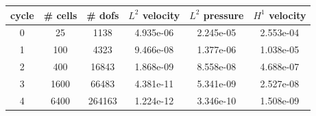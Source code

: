 \documentclass[10pt]{report}
\begin{document}
\begin{table}[H]
\begin{center}
\begin{tabular}{|c|c|c|c|c|c|} \hline
cycle & \# cells & \# dofs & $L^2$ velocity & $L^2$ pressure & $H^1$ velocity\\ \hline
0 & 25 & 1138 & 4.935e-06 & 2.245e-05 & 2.553e-04\\ \hline
1 & 100 & 4323 & 9.466e-08 & 1.377e-06 & 1.038e-05\\ \hline
2 & 400 & 16843 & 1.868e-09 & 8.558e-08 & 4.688e-07\\ \hline
3 & 1600 & 66483 & 4.381e-11 & 5.341e-09 & 2.527e-08\\ \hline
4 & 6400 & 264163 & 1.224e-12 & 3.346e-10 & 1.508e-09\\ \hline
\end{tabular}
\end{center}
\end{table}
\end{document}
